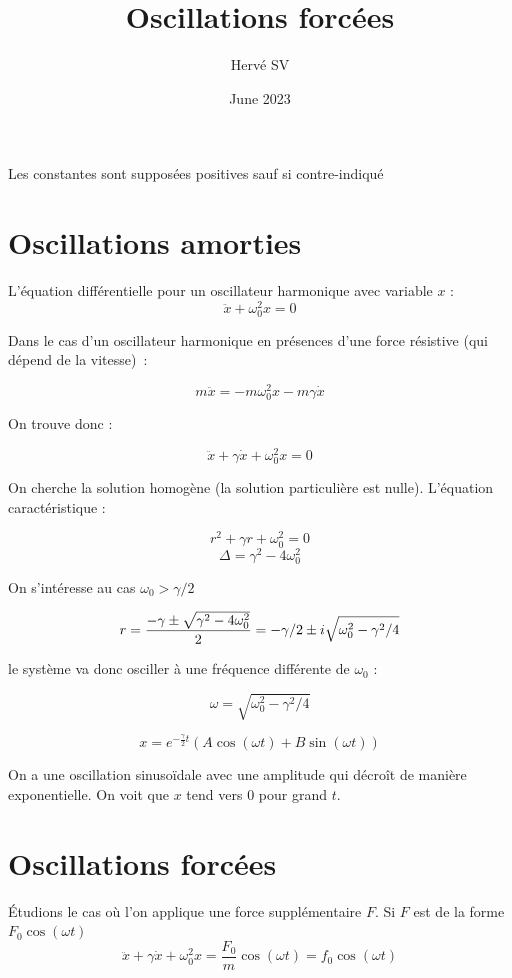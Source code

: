 \documentclass{article}
\title{Oscillations forcées}
\author{Hervé SV}
\date{June 2023}
\begin{document}
\maketitle

Les constantes sont supposées positives sauf si contre-indiqué

\section{Oscillations amorties}

L'équation différentielle pour un oscillateur harmonique avec variable $x$ :
\[ \ddot{x} + \omega_0^2 x = 0 \]

Dans le cas d'un oscillateur harmonique en présences d'une force résistive (qui dépend de la vitesse) :

\[ m\ddot{x} = -m\omega_0^2 x - m\gamma \dot{x} \]

On trouve donc :

\[ \ddot{x} + \gamma \dot{x} + \omega_0^2 x= 0 \]

On cherche la solution homogène (la solution particulière est nulle).
L'équation caractéristique :

\[ r^2 + \gamma r + \omega_0^2 = 0 \]
\[ \Delta = \gamma^2 - 4\omega_0^2 \]

On s'intéresse au cas $\omega_0 > \gamma/2$

\begin{dmath*}
    r  = \frac{-\gamma \pm \sqrt{\gamma^2 - 4\omega_0^2}}{2}\\
    = -\gamma/2 \pm i\sqrt{\omega_0^2 - \gamma^2/4}
\end{dmath*}

le système va donc osciller à une fréquence différente de $\omega_0$ : 

\[ \omega = \sqrt{\omega_0^2 - \gamma^2/4} \]

\begin{tcolorbox}
\[ x = e^{-\frac{\gamma}{2}t}(A\cos(\omega t) + B\sin(\omega t)) \]
\end{tcolorbox}

On a une oscillation sinusoïdale avec une amplitude qui décroît de manière exponentielle. On voit que $x$ tend vers 0 pour grand $t$.

\section{Oscillations forcées}

Étudions le cas où l'on 
applique une force supplémentaire $F$. Si $F$ est de la forme $F_0\cos(\omega t)$
\[ \ddot{x} + \gamma \dot{x}+ \omega_0^2 x = \frac{F_0}{m}\cos(\omega t)=f_0\cos(\omega t) \]
\end{document}

